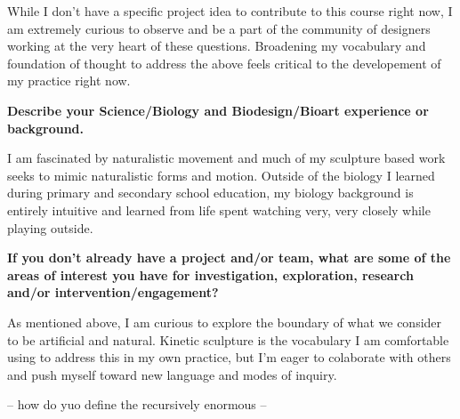 \documentclass[11pt]{report}
\begin{document}
While I don't have a specific project idea to contribute to this course right now, I am extremely curious to observe and be a part of the community of designers working at the very heart of these questions. Broadening my vocabulary and foundation of thought to address the above feels critical to the developement of my practice right now. 

\textbf{Describe your Science/Biology and Biodesign/Bioart experience or background.}

I am fascinated by naturalistic movement and much of my sculpture based work seeks to mimic naturalistic forms and motion. Outside of the biology I learned during primary and secondary school education, my biology background is entirely intuitive and learned from life spent watching very, very closely while playing outside.


\textbf{If you don’t already have a project and/or team, what are some of the areas of interest you have for investigation, exploration, research and/or intervention/engagement?}

As mentioned above, I am curious to explore the boundary of what we consider to be artificial and natural. Kinetic sculpture is the vocabulary I am comfortable using to address this in my own practice, but I'm eager to colaborate with others and push myself toward new language and modes of inquiry.  



-- how do yuo define the recursively enormous -- 
\end{document}
